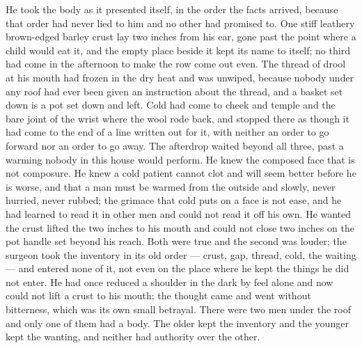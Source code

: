 He took the body as it presented itself, in the order the facts arrived, because that order had never lied to him and no other had promised to. One stiff leathery brown-edged barley crust lay two inches from his ear, gone past the point where a child would eat it, and the empty place beside it kept its name to itself; no third had come in the afternoon to make the row come out even. The thread of drool at his mouth had frozen in the dry heat and was unwiped, because nobody under any roof had ever been given an instruction about the thread, and a basket set down is a pot set down and left. Cold had come to cheek and temple and the bare joint of the wrist where the wool rode back, and stopped there as though it had come to the end of a line written out for it, with neither an order to go forward nor an order to go away. The afterdrop waited beyond all three, past a warming nobody in this house would perform. He knew the composed face that is not composure. He knew a cold patient cannot clot and will seem better before he is worse, and that a man must be warmed from the outside and slowly, never hurried, never rubbed; the grimace that cold puts on a face is not ease, and he had learned to read it in other men and could not read it off his own. He wanted the crust lifted the two inches to his mouth and could not close two inches on the pot handle set beyond his reach. Both were true and the second was louder; the surgeon took the inventory in its old order --- crust, gap, thread, cold, the waiting --- and entered none of it, not even on the place where he kept the things he did not enter. He had once reduced a shoulder in the dark by feel alone and now could not lift a crust to his mouth; the thought came and went without bitterness, which was its own small betrayal. There were two men under the roof and only one of them had a body. The older kept the inventory and the younger kept the wanting, and neither had authority over the other.

\scenebreak

